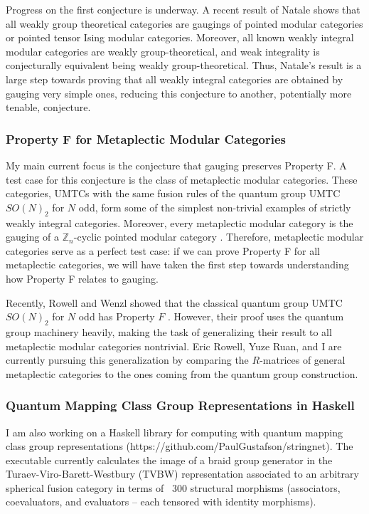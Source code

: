 \documentclass[12pt]{article}
\newcommand{\ZZ}{\mathbb{Z}}
\theoremstyle{definition}
\begin{document}
Progress on the first conjecture is underway. A recent result of Natale \cite{n} shows that all weakly group theoretical categories are gaugings of pointed modular categories or pointed tensor Ising modular categories.  Moreover, all known weakly integral modular categories are weakly group-theoretical, and weak integrality is conjecturally equivalent being weakly group-theoretical.  Thus, Natale's result is a large step towards proving that all weakly integral categories are obtained by gauging very simple ones, reducing this conjecture to another, potentially more tenable, conjecture.

\subsubsection*{Property F for Metaplectic Modular Categories}

My main current focus is the conjecture that gauging preserves Property F. A test case for this conjecture is the class of metaplectic modular categories.  These categories, UMTCs with the same fusion rules of the quantum group UMTC $SO(N)_2$ for $N$ odd,  form some of the simplest non-trivial examples of strictly weakly integral categories.   Moreover, every metaplectic modular category is the gauging of a $\ZZ_n$-cyclic pointed modular category \cite{acrw}.  Therefore, metaplectic modular categories serve as a perfect test case:  if we can prove Property F for all metaplectic categories, we will have taken the first step towards understanding how Property F relates to gauging.  

Recently,  Rowell and Wenzl showed that the classical quantum group UMTC $SO(N)_2$ for $N$ odd has Property $F$ \cite{rw}.  However, their proof uses the quantum group machinery heavily, making the task of generalizing their result to all metaplectic modular categories nontrivial.  Eric Rowell, Yuze Ruan, and I are currently pursuing this generalization by comparing the $R$-matrices of general metaplectic categories to the ones coming from the quantum group construction.

\subsubsection*{Quantum Mapping Class Group Representations in Haskell}
I am also working on a Haskell library for computing with quantum mapping class group representations  (https://github.com/PaulGustafson/stringnet).  The executable currently calculates the image of a braid group generator in the Turaev-Viro-Barett-Westbury (TVBW) representation associated to an arbitrary spherical fusion category in terms of ~300 structural morphisms (associators, coevaluators, and evaluators -- each tensored with identity morphisms).
\end{document}

